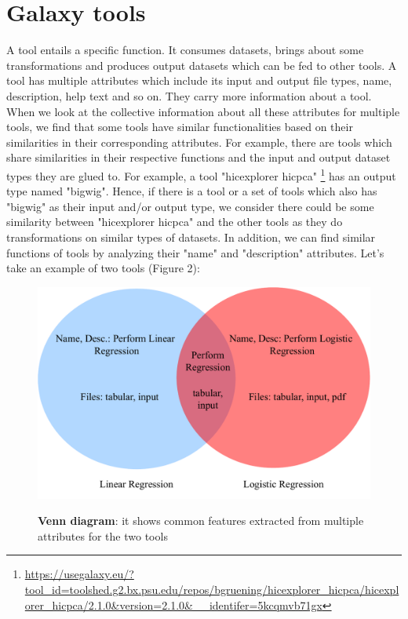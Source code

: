 \section{Galaxy tools}
A tool entails a specific function. It consumes datasets, brings about some transformations and produces output datasets which can be fed to other tools. A tool has multiple attributes which include its input and output file types, name, description, help text and so on. They carry more information about a tool. When we look at the collective information about all these attributes for multiple tools, we find that some tools have similar functionalities based on their similarities in their corresponding attributes. For example, there are tools which share similarities in their respective functions and the input and output dataset types they are glued to. For example, a tool "hicexplorer hicpca" \footnote{\url{https://usegalaxy.eu/?tool_id=toolshed.g2.bx.psu.edu/repos/bgruening/hicexplorer_hicpca/hicexplorer_hicpca/2.1.0&version=2.1.0&__identifer=5kcqmvb71gx}}  has an output type named "bigwig". Hence, if there is a tool or a set of tools which also has "bigwig" as their input and/or output type, we consider there could be some similarity between "hicexplorer hicpca" and the other tools as they do transformations on similar types of datasets. In addition, we can find similar functions of tools by analyzing their "name" and "description" attributes. Let's take an example of two tools (Figure 2):
 
\begin{figure}[h]
\begin{centering}
    {\includegraphics[scale=0.5]{figures/Venn_common_tools_info.pdf}}
    \caption[Venn diagram]{\textbf{Venn diagram}: it shows common features extracted from multiple attributes for the two tools}
\end{centering}
\end{figure}

